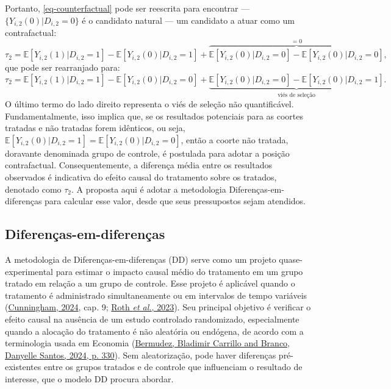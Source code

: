 \documentclass[12pt, a4paper, twoside]{article}
\numberwithin{equation}{subsection} %
\begin{document}
Portanto, \eqref{eq-counterfactual} pode ser reescrita para encontrar
--- \(\{Y_{i,2}(0) | D_{i,2} = 0\}\) é o candidato natural --- um
candidato a atuar como um contrafactual: \begin{equation*} 
\tau_2 = \mathbb{E}[Y_{i,2}(1)| D_{i,2} = 1] - \mathbb{E}[Y_{i,2}(0) | D_{i,2} = 1] + \overbrace{\mathbb{E}[Y_{i,2}(0) | D_{i,2} = 0] - \mathbb{E}[Y_{i,2}(0) | D_{i,2} = 0]}^{= 0},
\end{equation*} que pode ser rearranjado para: \begin{equation} 
      \tau_2 = \mathbb{E}[Y_{i,2}(1)| D_{i,2} = 1] - \mathbb{E}[Y_{i,2}(0) | D_{i,2} = 0] + \underbrace{\mathbb{E}[Y_{i,2}(0) | D_{i,2} = 0] - \mathbb{E}[Y_{i,2}(0) | D_{i,2} = 1]}_{\text{viés de seleção}}.
\end{equation} O último termo do lado direito representa o viés de
seleção não quantificável. Fundamentalmente, isso implica que, se os
resultados potenciais para as coortes tratadas e não tratadas forem
idênticos, ou seja,
\(\mathbb{E}[Y_{i,2}(0) | D_{i,2} = 1] = \mathbb{E}[Y_{i,2}(0) | D_{i,2} = 0]\),
então a coorte não tratada, doravante denominada grupo de controle, é
postulada para adotar a posição contrafactual. Consequentemente, a
diferença média entre os resultados observados é indicativa do efeito
causal do tratamento sobre os tratados, denotado como \(\tau_2\). A
proposta aqui é adotar a metodologia Diferenças-em-diferenças para
calcular esse valor, desde que seus pressupostos sejam atendidos.

\hypertarget{sec-did}{%
\subsection{Diferenças-em-diferenças}\label{sec-did}}

A metodologia de Diferenças-em-diferenças (DD) serve como um projeto
quase-experimental para estimar o impacto causal médio do tratamento em
um grupo tratado em relação a um grupo de controle. Esse projeto é
aplicável quando o tratamento é administrado simultaneamente ou em
intervalos de tempo variáveis
(\protect\hyperlink{ref-cunningham_causal_2024}{Cunningham, 2024}, cap.
9; \protect\hyperlink{ref-roth_whats_2023}{Roth \emph{et al.}, 2023}).
Seu principal objetivo é verificar o efeito causal na ausência de um
estudo controlado randomizado, especialmente quando a alocação do
tratamento é não aleatória ou endógena, de acordo com a terminologia
usada em Economia
(\protect\hyperlink{ref-bladimir_carrillo_bermudez_o_2024}{Bermudez,
Bladimir Carrillo and Branco, Danyelle Santos, 2024, p. 330}). Sem
aleatorização, pode haver diferenças pré-existentes entre os grupos
tratados e de controle que influenciam o resultado de interesse, que o
modelo DD procura abordar.
\end{document}
